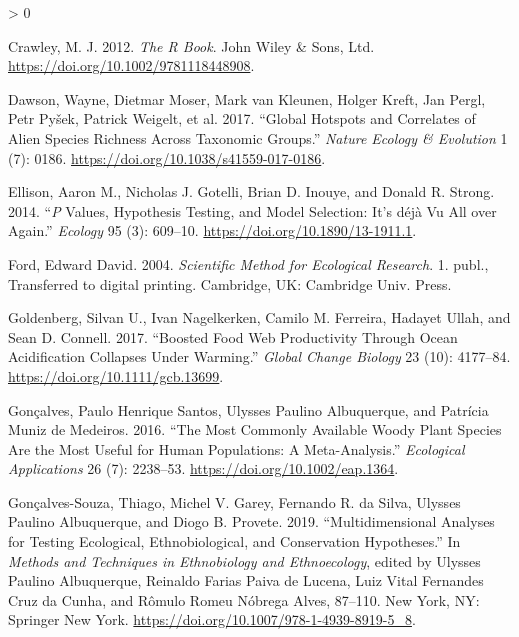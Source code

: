 \documentclass[
]{article}
\newlength{\cslhangindent}
\newenvironment{CSLReferences}[2] %
 {%
  \setlength{\parindent}{0pt}
  \ifodd #1 \everypar{\setlength{\hangindent}{\cslhangindent}}\ignorespaces\fi
  \ifnum #2 > 0
  \setlength{\parskip}{#2\baselineskip}
  \fi
 }%
 {}
\begin{document}
\begin{CSLReferences}{1}{0}
\leavevmode\hypertarget{ref-crawley_r_2012}{}%
Crawley, M. J. 2012. \emph{The {R} {Book}}. John Wiley \& Sons, Ltd. \url{https://doi.org/10.1002/9781118448908}.

\leavevmode\hypertarget{ref-dawson_global_2017}{}%
Dawson, Wayne, Dietmar Moser, Mark van Kleunen, Holger Kreft, Jan Pergl, Petr Pyšek, Patrick Weigelt, et al. 2017. {``Global Hotspots and Correlates of Alien Species Richness Across Taxonomic Groups.''} \emph{Nature Ecology \& Evolution} 1 (7): 0186. \url{https://doi.org/10.1038/s41559-017-0186}.

\leavevmode\hypertarget{ref-ellison_p_2014}{}%
Ellison, Aaron M., Nicholas J. Gotelli, Brian D. Inouye, and Donald R. Strong. 2014. {``\emph{P} Values, Hypothesis Testing, and Model Selection: It's déjà Vu All over Again.''} \emph{Ecology} 95 (3): 609--10. \url{https://doi.org/10.1890/13-1911.1}.

\leavevmode\hypertarget{ref-ford_scientific_2004}{}%
Ford, Edward David. 2004. \emph{Scientific Method for Ecological Research}. 1. publ., Transferred to digital printing. Cambridge, UK: Cambridge Univ. Press.

\leavevmode\hypertarget{ref-goldenberg_boosted_2017}{}%
Goldenberg, Silvan U., Ivan Nagelkerken, Camilo M. Ferreira, Hadayet Ullah, and Sean D. Connell. 2017. {``Boosted Food Web Productivity Through Ocean Acidification Collapses Under Warming.''} \emph{Global Change Biology} 23 (10): 4177--84. \url{https://doi.org/10.1111/gcb.13699}.

\leavevmode\hypertarget{ref-goncalves_most_2016}{}%
Gonçalves, Paulo Henrique Santos, Ulysses Paulino Albuquerque, and Patrícia Muniz de Medeiros. 2016. {``The Most Commonly Available Woody Plant Species Are the Most Useful for Human Populations: A Meta-Analysis.''} \emph{Ecological Applications} 26 (7): 2238--53. \url{https://doi.org/10.1002/eap.1364}.

\leavevmode\hypertarget{ref-albuquerque_multidimensional_2019}{}%
Gonçalves-Souza, Thiago, Michel V. Garey, Fernando R. da Silva, Ulysses Paulino Albuquerque, and Diogo B. Provete. 2019. {``Multidimensional {Analyses} for {Testing} {Ecological}, {Ethnobiological}, and {Conservation} {Hypotheses}.''} In \emph{Methods and {Techniques} in {Ethnobiology} and {Ethnoecology}}, edited by Ulysses Paulino Albuquerque, Reinaldo Farias Paiva de Lucena, Luiz Vital Fernandes Cruz da Cunha, and Rômulo Romeu Nóbrega Alves, 87--110. New York, NY: Springer New York. \url{https://doi.org/10.1007/978-1-4939-8919-5_8}.


\end{CSLReferences}
\end{document}
